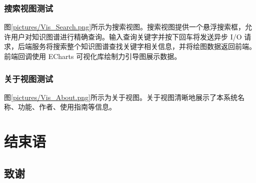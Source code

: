 \documentclass[a4paper,AutoFakeBold,oneside,12pt]{book}
\begin{document}

\subsection{搜索视图测试}

图\ref{pictures/Vis_Search.png}所示为搜索视图。搜索视图提供一个悬浮搜索框，允许用户对知识图谱进行精确查询。输入查询关键字并按下回车将发送异步 I/O 请求，后端服务将搜索整个知识图谱查找关键字相关信息，并将绘图数据返回前端。前端回调使用 ECharts 可视化库绘制力引导图展示数据。


\subsection{关于视图测试}

图\ref{pictures/Vis_About.png}所示为关于视图。关于视图清晰地展示了本系统名称、功能、作者、使用指南等信息。


\chapter{结束语}


\begin{nopagenumber}
	\clearpage{}
	

	\clearpage
	\chapter{致\qquad{}谢}
	\normalsize\thankwords

\end{nopagenumber}

\blankmatter



\blankmatter

\end{document}
